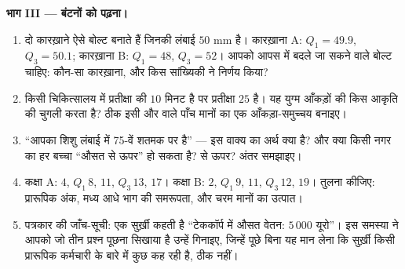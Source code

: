 \begin{problem}[{सप्ताहांत समस्या --- माध्य बनाम माध्यिका: बहिर्मान,
अंक-सुधार, सड़क किनारे का गोदाम, और वह कॉकपिट जो किसी के लिए नहीं बना}]
\medskip
\noindent\textbf{भाग III --- बंटनों को पढ़ना।}
\begin{enumerate}[resume]
  \item दो कारख़ाने ऐसे बोल्ट बनाते हैं जिनकी  लंबाई $50$ mm है।
        कारख़ाना A: $Q_1 = 49.9$, $Q_3 = 50.1$; कारख़ाना B: $Q_1 = 48$, $Q_3 = 52$। आपको आपस में
        बदले जा सकने वाले बोल्ट चाहिए: कौन-सा कारख़ाना, और किस सांख्यिकी ने
        निर्णय किया?
  \item किसी चिकित्सालय में प्रतीक्षा की  $10$ मिनट है पर 
        प्रतीक्षा $25$ है। यह युग्म आँकड़ों की किस आकृति की चुगली करता है?
        ठीक इसी  और  वाले पाँच मानों का एक आँकड़ा-समुच्चय
        बनाइए।
  \item ``आपका शिशु लंबाई में 75-वें शतमक पर है'' --- इस वाक्य का अर्थ
        क्या है? और क्या किसी नगर का हर बच्चा ``औसत से ऊपर'' हो सकता है?
         से ऊपर? अंतर समझाइए।
  \item कक्षा A:  $4$, $Q_1\,8$,  $11$, $Q_3\,13$,  $17$।
        कक्षा B:  $2$, $Q_1\,9$,  $11$, $Q_3\,12$,  $19$।
        तुलना कीजिए: प्रारूपिक अंक, मध्य आधे भाग की समरूपता, और चरम मानों
        का उत्पात।
  \item पत्रकार की जाँच-सूची: एक सुर्ख़ी कहती है ``टेककॉर्प में औसत वेतन:
        $5\,000$ यूरो''। इस समस्या ने आपको जो तीन प्रश्न पूछना सिखाया है उन्हें
        गिनाइए, जिन्हें पूछे बिना यह मान लेना कि सुर्ख़ी किसी प्रारूपिक
        कर्मचारी के बारे में कुछ कह रही है, ठीक नहीं।
\end{enumerate}


\end{problem}
